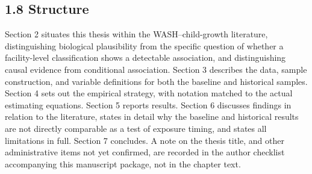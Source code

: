 \subsection*{1.8 Structure}

Section 2 situates this thesis within the WASH--child-growth literature, distinguishing biological plausibility from the specific question of whether a facility-level classification shows a detectable association, and distinguishing causal evidence from conditional association. Section 3 describes the data, sample construction, and variable definitions for both the baseline and historical samples. Section 4 sets out the empirical strategy, with notation matched to the actual estimating equations. Section 5 reports results. Section 6 discusses findings in relation to the literature, states in detail why the baseline and historical results are not directly comparable as a test of exposure timing, and states all limitations in full. Section 7 concludes. A note on the thesis title, and other administrative items not yet confirmed, are recorded in the author checklist accompanying this manuscript package, not in the chapter text.
